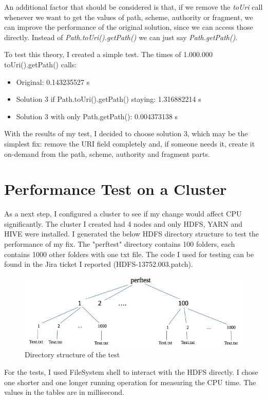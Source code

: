 An additional factor that should be considered is that, if we remove the \textit{toUri} call whenever we want to get the values of path, scheme, authority or fragment, we can improve the performance of the original solution, since we can access those directly. Instead of \textit{Path.toUri().getPath() } we can just say \textit{Path.getPath()}.

To test this theory, I created a simple test. The times of 1.000.000 toUri().getPath() calls:
\begin{itemize}
	\item Original: 0.143235527 s
	\item Solution 3 if Path.toUri().getPath() staying: 1.316882214 s
	\item Solution 3 with only Path.getPath(): 0.004373138 s
\end{itemize}

With the results of my test, I decided to choose solution 3, which may be the simplest fix: remove the URI field completely and, if someone needs it, create it on-demand from the path, scheme, authority and fragment parts.

\section{Performance Test on a Cluster}
As a next step, I configured a cluster to see if my change would affect CPU significantly. The cluster I created had 4 nodes and only HDFS, YARN and HIVE were installed. I generated the below HDFS directory structure to test the performance of my fix. The "perftest" directory contains 100 folders, each contains 1000 other folders with one txt file. The code I used for testing can be found in the Jira ticket I reported \cite{hdfs-path} (HDFS-13752.003.patch).

\begin{figure}[H]
	\includegraphics[width=125mm, keepaspectratio]{figures/directory_structure.png}
	\centering
	\caption{Directory structure of the test}
\end{figure}

For the tests, I used FileSystem shell to interact with the HDFS directly. I chose one shorter and one longer running operation for measuring the CPU time. The values in the tables are in millisecond.


